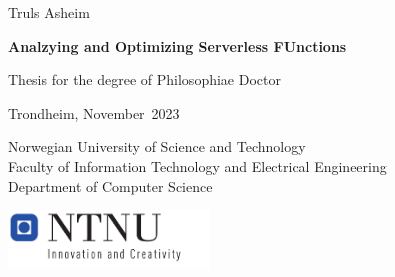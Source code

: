 \documentclass[../main.tex]{subfiles}
\begin{document}
\frontmatter
{
\sffamily
\parindent=0cm
\renewcommand{\headrulewidth}{0pt}
\addtolength{\parskip}{\baselineskip}
{\huge {Truls Asheim}}
\vspace{2cm}

{\textbf {\fontsize{27}{32}\selectfont Analzying and Optimizing Serverless FUnctions}}

{\LARGE }
\vspace{5cm}

{\Large Thesis for the degree of Philosophiae Doctor

Trondheim, November\ 2023

Norwegian University of Science and Technology \\
Faculty of Information Technology and Electrical Engineering \\
Department of Computer Science}
\vspace{5cm}

\includegraphics[width=0.4\textwidth]{../images/NTNUlogo.pdf}

\newpage
}
\end{document}

